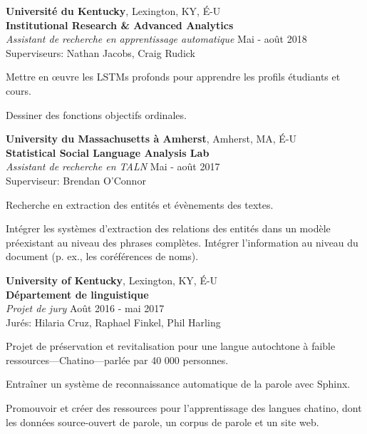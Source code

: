 \documentclass[10pt]{article}
\newcommand{\halfblankline}{\quad\vspace{-0.5\baselineskip}\pagebreak[3]}
\begin{document}
	{\textbf{Université du Kentucky}},
	Lexington, KY, É-U\\
	\textbf{Institutional Research \& Advanced Analytics}\\
		\textit{Assistant de recherche en apprentissage automatique}
		\hfill Mai - août 2018\\
		Superviseurs: Nathan Jacobs, Craig Rudick
		\begin{innerlist}
			\item Mettre en œuvre les LSTMs profonds pour apprendre les profils étudiants et cours.
			\item Dessiner des fonctions objectifs ordinales.
		\end{innerlist}

	\halfblankline

	{\textbf{University du Massachusetts à Amherst}},
	Amherst, MA, É-U\\
	\textbf{Statistical Social Language Analysis Lab}\\
		\textit{Assistant de recherche en TALN}%
		\hfill Mai - août 2017\\
		Superviseur: Brendan O'Connor
		\begin{innerlist}
			\item Recherche en extraction des entités et évènements des textes.
			\item Intégrer les systèmes d'extraction des relations des entités dans un modèle préexistant au niveau des phrases complètes. Intégrer l'information au niveau du document (p. ex., les coréférences de noms).
		\end{innerlist}
	
	\halfblankline
	
	{\textbf{University of Kentucky}},
	Lexington, KY, É-U\\
	\textbf{Département de linguistique}\\
		\textit{Projet de jury}%
		\hfill Août 2016 - mai 2017\\
		Jurés: Hilaria Cruz, Raphael Finkel, Phil Harling
		\begin{innerlist}
			\item Projet de préservation et revitalisation pour une langue autochtone à faible ressources---Chatino---parlée par 40 000 personnes.
			\item Entraîner un système de reconnaissance automatique de la parole avec Sphinx.
			\item Promouvoir et créer des ressources pour l'apprentissage des langues chatino, dont les données source-ouvert de parole, un corpus de parole et un site web.
		\end{innerlist}
	
\end{document}
